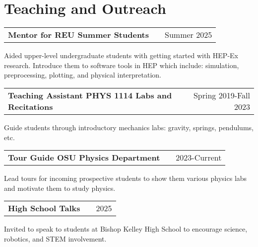 \documentclass[a4paper,12pt]{article}
\makeatletter
\newenvironment{jobshort}[2]
    {
    \begin{tabularx}{\linewidth}{@{}l X r@{}}
    \textbf{#1} & \hfill &  #2 \\[3.75pt]
    \end{tabularx}
    }
    {
    }
\makeatother
\begin{document}
\section{Teaching and Outreach}
\begin{jobshort}{Mentor for REU Summer Students}{Summer 2025}
Aided upper-level undergraduate students with getting started with HEP-Ex research. Introduce them to software tools in HEP which include: simulation, preprocessing, plotting, and physical interpretation.
\end{jobshort}

\begin{jobshort}{Teaching Assistant PHYS 1114 Labs and Recitations}{Spring 2019-Fall 2023}
Guide students through introductory mechanics labs: gravity, springs, pendulums, etc.
\end{jobshort}

\begin{jobshort}{Tour Guide OSU Physics Department}{2023-Current}
Lead tours for incoming prospective students to show them various physics labs and motivate them to study physics.
\end{jobshort}

\begin{jobshort}{High School Talks}{2025}
Invited to speak to students at Bishop Kelley High School to encourage science, robotics, and STEM involvement.
\end{jobshort}

\vfill
{}
\end{document}
